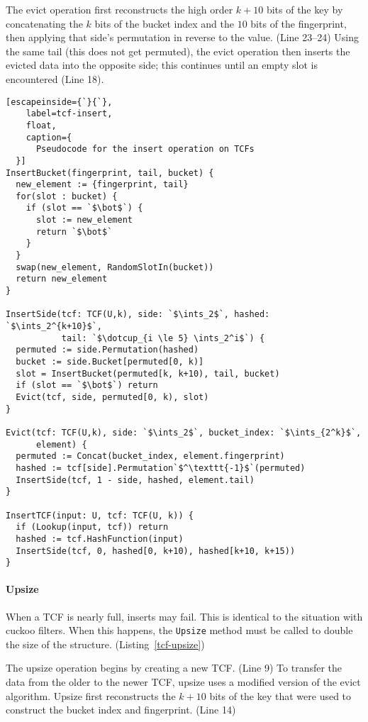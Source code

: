 \documentclass[letterpaper,twocolumn,10pt]{article}
\newcommand{\ints}{\mathbb{Z}}
\newcommand{\dotcup}{\ensuremath{\mathaccent\cdot\cup}}
\begin{document}
The evict operation first reconstructs the high order $k + 10$ bits of the key by concatenating the $k$ bits of the bucket index and the $10$ bits of the fingerprint, then applying that side's permutation in reverse to the value. (Line 23--24)
Using the same tail (this does not get permuted), the evict operation then inserts the evicted data into the opposite side;
this continues until an empty slot is encountered (Line 18).

\begin{lstlisting}[escapeinside={`}{`},
    label=tcf-insert,
    float,
    caption={
      Pseudocode for the insert operation on TCFs
  }]
InsertBucket(fingerprint, tail, bucket) {
  new_element := {fingerprint, tail}
  for(slot : bucket) {
    if (slot == `$\bot$`) {
      slot := new_element
      return `$\bot$`
    }
  }
  swap(new_element, RandomSlotIn(bucket))
  return new_element
}

InsertSide(tcf: TCF(U,k), side: `$\ints_2$`, hashed: `$\ints_2^{k+10}$`,
           tail: `$\dotcup_{i \le 5} \ints_2^i$`) {
  permuted := side.Permutation(hashed)
  bucket := side.Bucket[permuted[0, k)]
  slot = InsertBucket(permuted[k, k+10), tail, bucket)
  if (slot == `$\bot$`) return
  Evict(tcf, side, permuted[0, k), slot)
}

Evict(tcf: TCF(U,k), side: `$\ints_2$`, bucket_index: `$\ints_{2^k}$`,
      element) {
  permuted := Concat(bucket_index, element.fingerprint)
  hashed := tcf[side].Permutation`$^\texttt{-1}$`(permuted)
  InsertSide(tcf, 1 - side, hashed, element.tail)
}

InsertTCF(input: U, tcf: TCF(U, k)) {
  if (Lookup(input, tcf)) return
  hashed := tcf.HashFunction(input)
  InsertSide(tcf, 0, hashed[0, k+10), hashed[k+10, k+15))
}
\end{lstlisting}

\paragraph{Upsize}
When a TCF is nearly full, inserts may fail.
This is identical to the situation with cuckoo filters.
When this happens, the \texttt{Upsize} method must be called to double the size of the structure. (Listing~\ref{tcf-upsize})

The upsize operation begins by creating a new TCF. (Line 9)
To transfer the data from the older to the newer TCF, upsize uses a modified version of the evict algorithm.
Upsize first reconstructs the $k+10$ bits of the key that were used to construct the bucket index and fingerprint. (Line 14)
\end{document}
